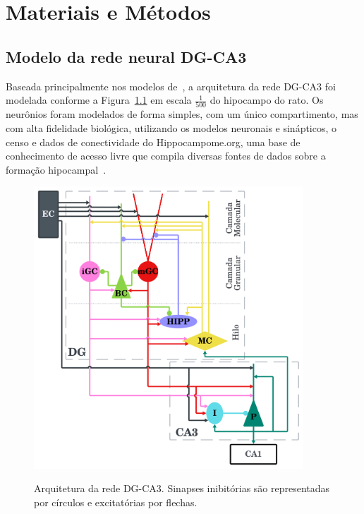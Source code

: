 \chapter{Materiais e Métodos}

\section{Modelo da rede neural DG-CA3}


Baseada principalmente nos modelos de~\cite{kopsickFormation2024,kimAdult2024,yangDynamic2025,chavlisDendrites2017}, a arquitetura
da rede DG-CA3 foi modelada conforme a Figura~\ref{fig:arquitetura-rede} em escala $\frac{1}{500}$ do hipocampo do rato. Os
neurônios foram modelados de forma simples, com um único compartimento, mas com alta fidelidade biológica, utilizando os modelos
neuronais e sinápticos, o censo e dados de conectividade do Hippocampome.org, uma base de conhecimento de acesso livre que compila
diversas fontes de dados sobre a formação hipocampal~\cite{wheelerHippocampomeorg2023}.

\begin{figure}[H]
    \centering
    \caption{Arquitetura da rede DG-CA3. Sinapses inibitórias são representadas por círculos e excitatórias por flechas.}
    \includegraphics[width=0.9\textwidth]{figuras/arquitetura-rede.png}
    \label{fig:arquitetura-rede}
\end{figure}

